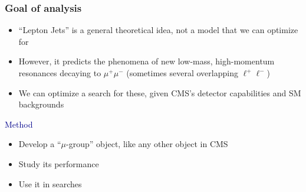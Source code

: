 \documentclass[compress]{beamer}
\begin{document}
\begin{frame}
\frametitle{Goal of analysis}
\begin{itemize}
\item ``Lepton Jets'' is a general theoretical idea, not a model that we can optimize for
\item However, it predicts the phenomena of new low-mass,
  high-momentum resonances decaying to $\mu^+\mu^-$ (sometimes several overlapping $\ell^+\ell^-$)
\item We can optimize a search for these, given CMS's detector capabilities and SM backgrounds
\end{itemize}

\vfill
\hspace{-0.83 cm} \textcolor{darkblue}{\Large Method}

\vspace{0.25 cm}
\begin{itemize}
\item Develop a ``$\mu$-group'' object, like any other object in CMS
\item Study its performance
\item Use it in searches
\end{itemize}
\end{frame}
\end{document}
